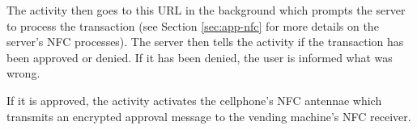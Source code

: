 The activity then goes to this URL in the background which prompts the server to
process the transaction (see Section \ref{sec:app-nfc} for more details on the
server's NFC processes). The server then tells the activity if the transaction
has been approved or denied. If it has been denied, the user is informed what was wrong. 

If it is approved, the activity activates the cellphone's NFC antennae which
transmits an encrypted approval message to the vending machine's NFC receiver. 
